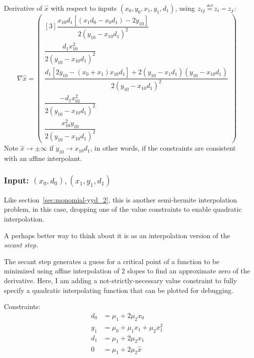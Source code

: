 Derivative of $\hat{x}$ with respect to inputs
$(x_0,y_0,x_1,y_1,d_1)$,
using $z_{ij} \operatorname*{\overset{\underset{\mathrm{def}}{}}{=}} z_i - z_j$:
\begin{equation}
\nabla \hat{x} =
\begin{pmatrix}[3]
\dfrac{
x_{10} d_1 \left[ \left(x_1 d_0 - x_0 d_1 \right) -2 y_{10}\right]
}{
2 \left(y_{10} - x_{10} d_1\right)^{2}
}
\\
\dfrac{
d_1 x_{10}^{2}
}{
2 \left(y_{10} - x_{10} d_1\right)^{2}
} 
\\
\dfrac{
d_1 \left[ 2 y_{10} - \left( x_0 + x_1 \right) x_{10} d_1 \right]
+
2 
\left(y_{10} - x_1 d_1 \right) \left( y_{10} - x_{10} d_1 \right)
}{
2 \left(y_{10} - x_{10} d_1\right)^{2}
}
\\
\dfrac{
-d_1 x_{01}^{2}
}{
2 \left(y_{10} - x_{10} d_1\right)^{2}
}
\\ 
\dfrac{x_{10}^{2} y_{10}}{
2 \left(y_{10} - x_{10} d_1\right)^{2}
}
\end{pmatrix}
\end{equation}
Note $\hat{x} \to \pm \infty$ if $y_{10} \to x_{10} d_1$,
in other words, if the constraints are consistent with an
affine interpolant.

\subsubsection{Input: $(x_0,d_0),(x_1,y_1,d_1)$}\label{sec:monomial-dyd}

Like section~\ref{sec:monomial-yyd_2},
this is another semi-hermite interpolation problem,
in this case, dropping one of the value constraints to enable 
quadratic interpolation.

A perhaps better way to think about it is as an interpolation
version of the \textit{secant step.}

The secant step generates a guess for a critical point
of a function to be minimized using affine interpolation
of $2$ slopes to find an approximate zero of the derivative.
Here, I am adding a not-strictly-necessary value constraint 
to fully specify a quadratic interpolating function that can be 
plotted for debugging.

Constraints:
\begin{align}
d_0 & = \mu_1 + 2 \mu_2 x_0
\\
y_1 & = \mu_0 + \mu_1 x_1 + \mu_2 x_1^2
\nonumber
\\
d_1 & = \mu_1 + 2 \mu_2 x_1
\nonumber
\\
0 & = \mu_1 + 2 \mu_2 \hat{x}
\nonumber
\end{align}

